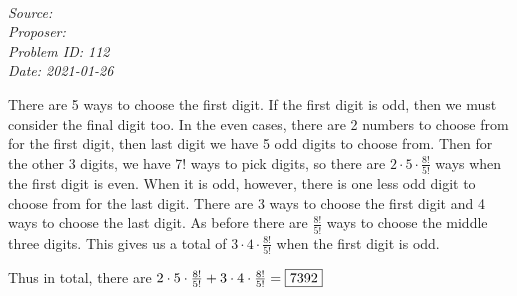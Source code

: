  \SSbreak\\
\emph{Source: \Cfolk}\\
\emph{Proposer: \Pkiesh}\\ %
\emph{Problem ID: 112}\\
\emph{Date: 2021-01-26}\\
\SSbreak

\bigskip

\begin{solution}\hfil\medskip

There are 5 ways to choose the first digit. If the first digit is odd, then we must consider the final digit too. In the even cases, there are 2 numbers to choose from for the first digit, then last digit we have 5 odd digits to choose from. Then for the other 3 digits, we have 7! ways to pick digits, so there are \(2\cdot5\cdot\frac{8!}{5!}\) ways when the first digit is even. When it is odd, however, there is one less odd digit to choose from for the last digit. There are 3 ways to choose the first digit and 4 ways to choose the last digit. As before there are \(\frac{8!}{5!}\) ways to choose the middle three digits. This gives us a total of \(3\cdot4\cdot\frac{8!}{5!}\) when the first digit is odd.

Thus in total, there are \(2\cdot5\cdot\frac{8!}{5!}+3\cdot4\cdot\frac{8!}{5!}=\fbox{7392}\)
\end{solution}\bigskip
